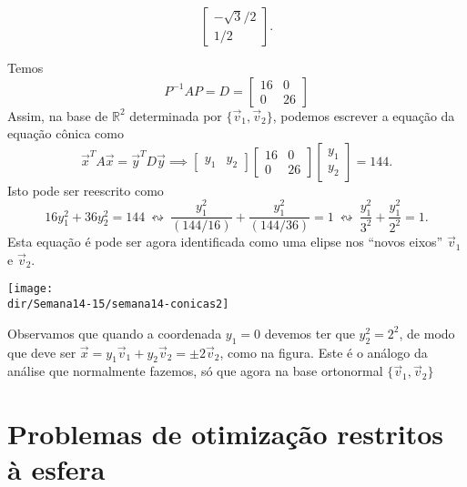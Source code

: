 \documentclass[../livro.tex]{subfiles}
\providecommand{\dir}{..}  %
\begin{document}
\begin{example}
\begin{itemize}
\begin{equation}
		\begin{bmatrix}
		-\sqrt{3}/2 \\ 1/2
		\end{bmatrix}.
		\end{equation}
	\end{itemize} Temos
	\begin{equation}
	P^{-1} A P = D =
	\begin{bmatrix}
	16 & 0 \\ 0 & 26
	\end{bmatrix}
	\end{equation} Assim, na base de $\mathbb{R}^2$ determinada por $\{\vec{v}_1, \vec{v}_2\}$, podemos escrever a equação da equação cônica como
	\begin{equation}
	\vec{x}^T A \vec{x} = \vec{y}^T D \vec{y} \implies 
	\begin{bmatrix}
	y_1 & y_2
	\end{bmatrix}
	\begin{bmatrix}
	16 & 0 \\ 0 & 26
	\end{bmatrix}
	\begin{bmatrix}
	y_1 \\ y_2
	\end{bmatrix} = 144.
	\end{equation} Isto pode ser reescrito como
	\begin{equation}
	16 y_1^2 + 36 y_2^2 = 144 \ \leftrightsquigarrow \ \frac{y_1^2}{(144/16)} + \frac{y_1^2}{(144/36)} = 1 \ \leftrightsquigarrow \ \frac{y_1^2}{3^2} + \frac{y_1^2}{2^2} = 1.
	\end{equation} Esta equação é pode ser agora identificada como uma elipse nos ``novos eixos'' $\vec{v}_1$ e $\vec{v}_2$.
	\begin{center}
		\texttt{[image: \\dir/Semana14-15/semana14-conicas2]}
	\end{center}
	
	\noindent Observamos que quando a coordenada $y_1 = 0$ devemos ter que $y_2^2 = 2^2$, de modo que deve ser $\vec{x} = y_1 \vec{v}_1 + y_2 \vec{v}_2 = \pm 2 \vec{v}_2$, como na figura. Este é o análogo da análise que normalmente fazemos, só que agora na base ortonormal $\{\vec{v}_1, \vec{v}_2\}$
\end{example}


\section{Problemas de otimização restritos à esfera}
\end{document}
